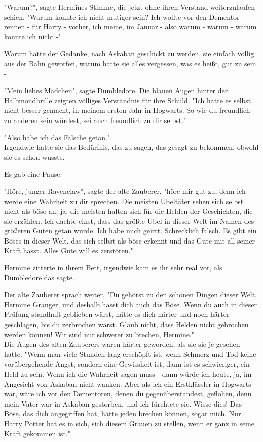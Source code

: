 {"Warum?", sagte Hermines Stimme, die jetzt ohne ihren Verstand weiterzulaufen schien. "Warum konnte ich nicht mutiger sein? Ich wollte vor den Dementor rennen - für Harry - vorher, ich meine, im Januar - also warum - warum - warum konnte ich nicht -"

Warum hatte der Gedanke, nach Askaban geschickt zu werden, sie einfach völlig aus der Bahn geworfen, warum hatte sie alles vergessen, was es heißt, gut zu sein -

"Mein liebes Mädchen", sagte Dumbledore. Die blauen Augen hinter der Halbmondbrille zeigten völliges Verständnis für ihre Schuld. "Ich hätte es selbst nicht besser gemacht, in meinem ersten Jahr in Hogwarts. So wie du freundlich zu anderen sein würdest, sei auch freundlich zu dir selbst."

"Also habe ich das Falsche getan."\\ Irgendwie hatte sie das Bedürfnis, das zu sagen, das gesagt zu bekommen, obwohl sie es schon wusste.

Es gab eine Pause.

"Höre, junger Ravenclaw", sagte der alte Zauberer, "höre mir gut zu, denn ich werde eine Wahrheit zu dir sprechen. Die meisten Übeltäter sehen sich selbst nicht als böse an, ja, die meisten halten sich für die Helden der Geschichten, die sie erzählen. Ich dachte einst, dass das größte Übel in dieser Welt im Namen des größeren Guten getan wurde. Ich habe mich geirrt. Schrecklich falsch. Es gibt ein Böses in dieser Welt, das sich selbst als böse erkennt und das Gute mit all seiner Kraft hasst. Alles Gute will es zerstören."

Hermine zitterte in ihrem Bett, irgendwie kam es ihr sehr real vor, als Dumbledore das sagte.

Der alte Zauberer sprach weiter. "Du gehörst zu den schönen Dingen dieser Welt, Hermine Granger, und deshalb hasst dich auch das Böse. Wenn du auch in dieser Prüfung standhaft geblieben wärst, hätte es dich härter und noch härter geschlagen, bis du zerbrochen wärst. Glaub nicht, dass Helden nicht gebrochen werden können! Wir sind nur schwerer zu brechen, Hermine."\\ Die Augen des alten Zauberers waren härter geworden, als sie sie je gesehen hatte. "Wenn man viele Stunden lang erschöpft ist, wenn Schmerz und Tod keine vorübergehende Angst, sondern eine Gewissheit ist, dann ist es schwieriger, ein Held zu sein. Wenn ich die Wahrheit sagen muss - dann würde ich heute, ja, im Angesicht von Askaban nicht wanken. Aber als ich ein Erstklässler in Hogwarts war, wäre ich vor den Dementoren, denen du gegenüberstandest, geflohen, denn mein Vater war in Askaban gestorben, und ich fürchtete sie. Wisse dies! Das Böse, das dich angegriffen hat, hätte jeden brechen können, sogar mich. Nur Harry Potter hat es in sich, sich diesem Grauen zu stellen, wenn er ganz in seine Kraft gekommen ist."

}
